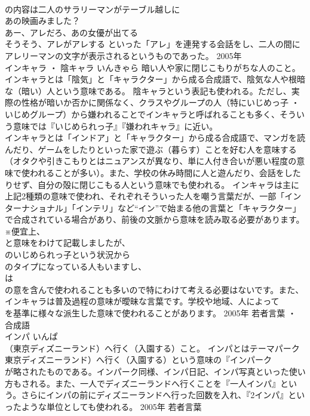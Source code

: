 \documentclass[8pt]{extreport}
\begin{document}
\begin{CJK}{UTF8}{min}
\\	の内容は二人のサラリーマンがテーブル越しに 　
\\	あの映画みました？ 　
\\	あー、アレだろ、あの女優が出てる 　
\\	そうそう、アレがアレする といった「アレ」を連発する会話をし、二人の間にアレリーマンの文字が表示されるというものであった。	2005年	
\\	インキャラ ・ 陰キャラ	いんきゃら	暗い人や家に閉じこもりがちな人のこと。	
\\	インキャラとは「陰気」と「キャラクター」から成る合成語で、陰気な人や根暗な（暗い）人という意味である。 陰キャラという表記も使われる。ただし、実際の性格が暗いか否かに関係なく、クラスやグループの人（特にいじめっ子 ・ いじめグループ）から嫌われることでインキャラと呼ばれることも多く、そういう意味では『いじめられっ子』『嫌われキャラ』に近い。 
\\	インキャラとは「インドア」と「キャラクター」から成る合成語で、マンガを読んだり、ゲームをしたりといった家で遊ぶ（暮らす）ことを好む人を意味する（オタクや引きこもりとはニュアンスが異なり、単に人付き合いが悪い程度の意味で使われることが多い）。また、学校の休み時間に人と遊んだり、会話をしたりせず、自分の殻に閉じこもる人という意味でも使われる。 インキャラは主に上記2種類の意味で使われ、それぞれそういった人を嘲う言葉だが、一部「インターナショナル」「インテリ」など“イン”で始まる他の言葉と「キャラクター」で合成されている場合があり、前後の文脈から意味を読み取る必要があります。 ※便宜上、
\\	と意味をわけて記載しましたが、
\\	のいじめられっ子という状況から
\\	のタイプになっている人もいますし、
\\	は
\\	の意を含んで使われることも多いので特にわけて考える必要はないです。また、インキャラは普及過程の意味が曖昧な言葉です。学校や地域、人によって
\\	を基準に様々な派生した意味で使われることがあります。	2005年	若者言葉 ・ 合成語	
\\	インパ	いんぱ	
\\	（東京ディズニーランド）へ行く（入園する）こと。	インパとはテーマパーク
\\	東京ディズニーランド）へ行く（入園する）という意味の『インパーク
\\	が略されたものである。インパーク同様、インパ日記、インパ写真といった使い方もされる。また、一人でディズニーランドへ行くことを『一人インパ』という。さらにインパの前にディズニーランドへ行った回数を入れ、『2インパ』といったような単位としても使われる。	2005年	若者言葉	

\end{CJK}
\end{document}
